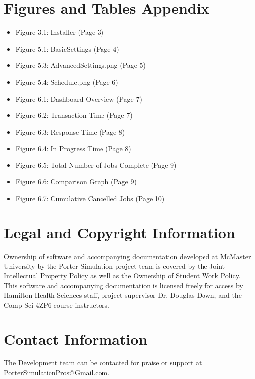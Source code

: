 \documentclass[paper=letter, fontsize=10pt]{scrartcl}
\numberwithin{equation}{section}		%
\numberwithin{figure}{section}			%
\numberwithin{table}{section}				%
\begin{document}
\section{Figures and Tables Appendix}
\begin{itemize}
	\item Figure 3.1: Installer (Page 3)
	\item Figure 5.1: BasicSettings (Page 4)
	\item Figure 5.3: AdvancedSettings.png (Page 5)
	\item Figure 5.4: Schedule.png (Page 6)
	\item Figure 6.1: Dashboard Overview (Page 7)
	\item Figure 6.2: Transaction Time (Page 7)
	\item Figure 6.3: Response Time (Page 8)
	\item Figure 6.4: In Progress Time (Page 8)
	\item Figure 6.5: Total Number of Jobs Complete (Page 9)
	\item Figure 6.6: Comparison Graph (Page 9)
	\item Figure 6.7: Cumulative Cancelled Jobs (Page 10)
\end{itemize}

\section{Legal and Copyright Information}
Ownership of software and accompanying documentation developed at McMaster University by the Porter Simulation project team is covered by the Joint Intellectual Property Policy as well as the Ownership of Student Work Policy. This software and accompanying documentation is licensed freely for access by Hamilton Health Sciences staff, project supervisor Dr. Douglas Down, and the Comp Sci 4ZP6 course instructors.

\section{Contact Information}
The Development team can be contacted for praise or support at PorterSimulationPros@Gmail.com.



\end{document}
